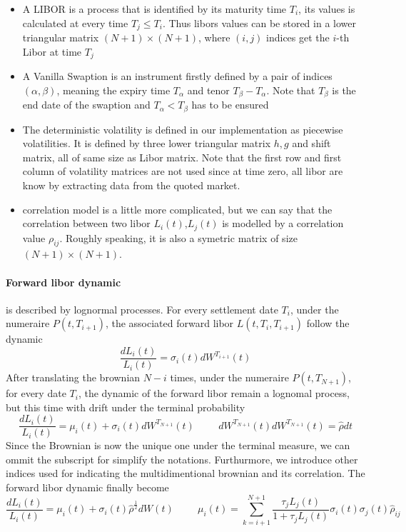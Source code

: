 \documentclass[a4paper,10pt]{article}
\newcommand{\Ti}{T_{i}}
\newcommand{\Ta}{T_{\alpha}}
\newcommand{\Tb}{T_{\beta}}
\newcommand{\Tii}{T_{i+1}}
\newcommand{\Ptii}{P(t,T_{i+1})}
\newcommand{\Lti}{L(t,\Ti,\Tii)}
\newcommand{\Lit}{L_{i}(t)}
\newcommand{\muit}{\mu_i(t)}
\newcommand{\sigmait}{\sigma_i(t)}
\newcommand{\Wit}{W^{\Tii}(t)}
\newcommand{\Wnt}{W^{T_{N+1}}(t)}
\newcommand{\Ljt}{L_{j}(t)}
\newcommand{\sigmajt}{\sigma_j(t)}
\newcommand{\rhoij}{\rho_{ij}}
\begin{document}
\begin{itemize}
 \item A LIBOR is a process that is identified by its maturity time $T_i$, its values is calculated at every time $T_j\leq T_i$. Thus libors values can be stored in a lower triangular matrix $(N+1)\times(N+1)$, where $(i,j)$ indices get the $i$-th Libor at time $T_j$
 \item A Vanilla Swaption is an instrument firstly defined by a pair of indices $(\alpha,\beta)$, meaning the expiry time $\Ta$ and tenor $\Tb-\Ta$. Note that $\Tb$ is the end date of the swaption and $\Ta<\Tb$ has to be ensured
 \item The deterministic volatility is defined in our implementation as piecewise volatilities. It is defined by three lower triangular matrix $h,g$ and shift matrix, all of same size as Libor matrix. Note that the first row and first column of volatility matrices are not used since at time zero, all libor are know by extracting data from the quoted market.
 \item correlation model is a little more complicated, but we can say that the correlation between two libor $\Lit$,$\Ljt$ is modelled by a correlation value $\rhoij$. Roughly speaking, it is also a symetric matrix of size $(N+1)\times(N+1)$.   
\end{itemize}
\paragraph{Forward libor dynamic } is described by lognormal processes. For every settlement date $\Ti$, under the numeraire $\Ptii$, the associated forward libor $\Lti$ follow the dynamic
\[
\frac{d\Lit}{\Lit} = \sigmait d\Wit
\]
After translating the brownian $N-i$ times, under the numeraire $P(t,T_{N+1})$, for every date $\Ti$, the dynamic of the forward libor remain a lognomal process, but this time with drift under the terminal probability  
\[
\frac{d\Lit}{\Lit} = \muit + \sigmait d\Wnt
\hspace{1cm}
d\Wnt d\Wnt = \hat{\rho} dt
\]
Since the Brownian is now the unique one under the terminal measure, we can ommit the subscript for simplify the notations. Furthurmore, we introduce other indices used for indicating the multidimentional brownian and its correlation. The forward libor dynamic finally become
\begin{equation}
\label{eq:libor_dynamic}
\frac{d\Lit}{\Lit} = \muit + \sigmait \hat{\rho}^{\frac{1}{2} } dW(t)
\hspace{1cm}
\muit = \sum_{k=i+1}^{N+1} \frac{\tau_j \Ljt}{1+\tau_j \Ljt} \sigmait \sigmajt \hat{\rho}_{ij}
\end{equation}
\end{document}
